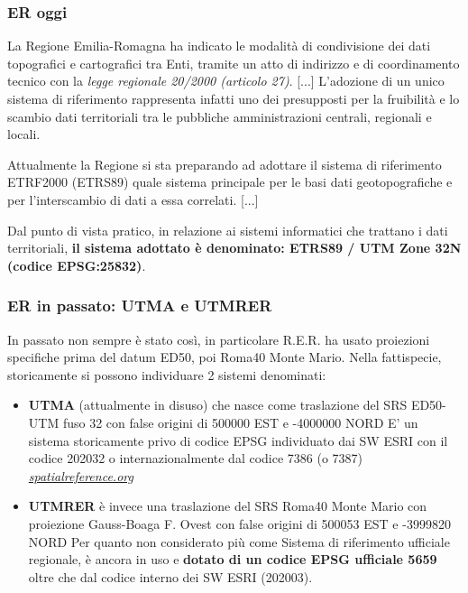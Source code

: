 \documentclass{beamer}
\begin{document}
{\begin{frame}
	\frametitle{ER oggi}
	La Regione Emilia-Romagna ha indicato le modalità di condivisione dei dati topografici e cartografici tra Enti, tramite un atto di indirizzo e di coordinamento tecnico con la \textit{legge regionale 20/2000 (articolo 27)}.
	[...]
	L’adozione di un unico sistema di riferimento rappresenta infatti uno dei presupposti per la fruibilità e lo scambio dati territoriali tra le pubbliche amministrazioni centrali, regionali e locali.
	
	Attualmente la Regione si sta preparando ad adottare il sistema di riferimento ETRF2000 (ETRS89) quale sistema principale per le basi dati geotopografiche e per l’interscambio di dati a essa correlati. [...]%
	
	Dal punto di vista pratico, in relazione ai sistemi informatici che trattano i dati territoriali, \textbf{il sistema adottato è denominato: ETRS89 / UTM Zone 32N (codice EPSG:25832)}.
	
\end{frame}

\begin{frame}
	\frametitle{ER in passato: UTMA e UTMRER}
	In passato non sempre è stato così, in particolare R.E.R. ha usato proiezioni specifiche prima del datum ED50, poi Roma40 Monte Mario. Nella fattispecie, storicamente si possono individuare 2 sistemi denominati: 
	\small
	\begin{itemize}
		\item \textbf{UTMA} (attualmente in disuso) che nasce come traslazione del SRS ED50-UTM fuso 32 con false origini  di 500000 EST e -4000000 NORD
		E' un sistema  storicamente privo di codice EPSG individuato dai SW ESRI con il  codice 202032 o internazionalmente dal codice 7386 (o 7387) \href{http://spatialreference.org/ref/sr-org/7386/}{\textcolor{gter}{\emph{spatialreference.org}}} 
		\item \textbf{UTMRER} è invece una traslazione del SRS Roma40 Monte Mario con proiezione Gauss-Boaga F. Ovest con false origini  di 500053 EST e -3999820 NORD 
		Per quanto non considerato più come Sistema di riferimento ufficiale regionale, è ancora in uso e \textbf{dotato di un codice EPSG ufficiale 5659} oltre che dal codice interno dei SW ESRI (202003).
		

\end{itemize}
\end{frame}}
\end{document}
